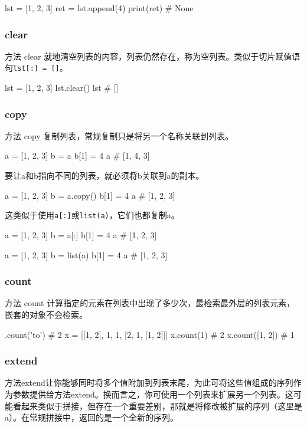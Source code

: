 \begin{pyc}
lst = [1, 2, 3]
ret = lst.append(4)
print(ret)  # None
\end{pyc}

\subsubsection{clear}
方法 clear 就地清空列表的内容，列表仍然存在，称为空列表。类似于切片赋值语句\verb|lst[:] = []|。
\begin{pyc}
lst = [1, 2, 3]
lst.clear()
lst  # []
\end{pyc}
\subsubsection{copy}
方法 copy 复制列表，常规复制只是将另一个名称关联到列表。
\begin{pyc}
a = [1, 2, 3]
b = a
b[1] = 4
a  # [1, 4, 3]
\end{pyc}
要让a和b指向不同的列表，就必须将b关联到a的副本。
\begin{pyc}
a = [1, 2, 3]
b = a.copy()
b[1] = 4
a  # [1, 2, 3]
\end{pyc}
这类似于使用\verb|a[:]|或\verb|list(a)|，它们也都复制a。
\begin{pyc}
a = [1, 2, 3]
b = a[:]
b[1] = 4
a  # [1, 2, 3]

a = [1, 2, 3]
b = list(a)
b[1] = 4
a  # [1, 2, 3]
\end{pyc}
\subsubsection{count}
方法 count 计算指定的元素在列表中出现了多少次，最检索最外层的列表元素，嵌套的对象不会检索。
\begin{pyc}
['to', 'be', 'or', 'not', 'to', 'be'].count('to')  # 2
x = [[1, 2], 1, 1, [2, 1, [1, 2]]]
x.count(1)  # 2
x.count([1, 2])  # 1
\end{pyc}

\subsubsection{extend}
方法extend让你能够同时将多个值附加到列表末尾，为此可将这些值组成的序列作为参数提供给方法extend。换而言之，你可使用一个列表来扩展另一个列表。这可能看起来类似于拼接，但存在一个重要差别，那就是将修改被扩展的序列（这里是a）。在常规拼接中，返回的是一个全新的序列。

